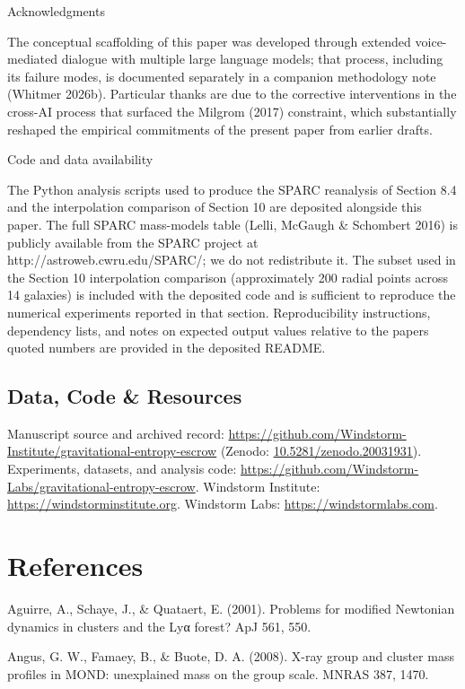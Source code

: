 \documentclass[11pt]{article}
\begin{document}
Acknowledgments

The conceptual scaffolding of this paper was developed through extended voice-mediated dialogue with multiple large language models; that process, including its failure modes, is documented separately in a companion methodology note (Whitmer 2026b). Particular thanks are due to the corrective interventions in the cross-AI process that surfaced the Milgrom (2017) constraint, which substantially reshaped the empirical commitments of the present paper from earlier drafts.

Code and data availability

The Python analysis scripts used to produce the SPARC reanalysis of Section 8.4 and the interpolation comparison of Section 10 are deposited alongside this paper. The full SPARC mass-models table (Lelli, McGaugh \& Schombert 2016) is publicly available from the SPARC project at http://astroweb.cwru.edu/SPARC/; we do not redistribute it. The subset used in the Section 10 interpolation comparison (approximately 200 radial points across 14 galaxies) is included with the deposited code and is sufficient to reproduce the numerical experiments reported in that section. Reproducibility instructions, dependency lists, and notes on expected output values relative to the paper\textquotesingle s quoted numbers are provided in the deposited README.

\subsection*{Data, Code \& Resources}
\noindent Manuscript source and archived record: \url{https://github.com/Windstorm-Institute/gravitational-entropy-escrow} (Zenodo: \href{https://doi.org/10.5281/zenodo.20031931}{10.5281/zenodo.20031931}). Experiments, datasets, and analysis code: \url{https://github.com/Windstorm-Labs/gravitational-entropy-escrow}. Windstorm Institute: \url{https://windstorminstitute.org}. Windstorm Labs: \url{https://windstormlabs.com}.

\section*{References}
\begingroup\small\setlength{\parindent}{-1.6em}\setlength{\leftskip}{1.6em}\setlength{\parskip}{3pt}

Aguirre, A., Schaye, J., \& Quataert, E. (2001). Problems for modified Newtonian dynamics in clusters and the Lyα forest? ApJ 561, 550.

Angus, G. W., Famaey, B., \& Buote, D. A. (2008). X-ray group and cluster mass profiles in MOND: unexplained mass on the group scale. MNRAS 387, 1470.
\end{document}
